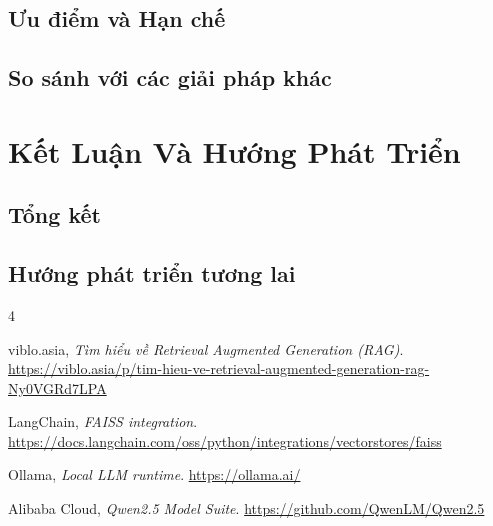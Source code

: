 \documentclass[conference]{IEEEtran}
\begin{document}
\subsection{Ưu điểm và Hạn chế}
\subsection{So sánh với các giải pháp khác}

\section{Kết Luận Và Hướng Phát Triển}

\subsection{Tổng kết}
\subsection{Hướng phát triển tương lai}

\begin{thebibliography}{4}

viblo.asia,
\textit{Tìm hiểu về Retrieval Augmented Generation (RAG)}.
\url{https://viblo.asia/p/tim-hieu-ve-retrieval-augmented-generation-rag-Ny0VGRd7LPA}

LangChain,
\textit{FAISS integration}.
\url{https://docs.langchain.com/oss/python/integrations/vectorstores/faiss}

Ollama,
\textit{Local LLM runtime}.
\url{https://ollama.ai/}

Alibaba Cloud,
\textit{Qwen2.5 Model Suite}.
\url{https://github.com/QwenLM/Qwen2.5}

\end{thebibliography}
\end{document}
